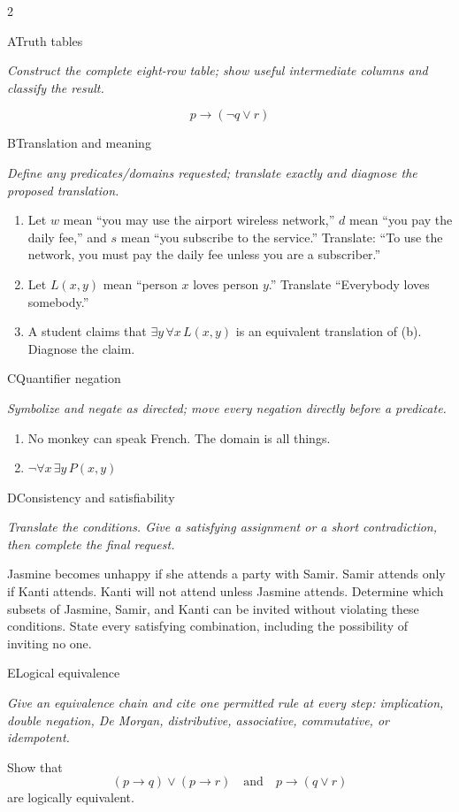 \documentclass[9pt]{extarticle}
\begin{document}
\begin{multicols}{2}
\begin{CoreProblem}{A}{Truth tables}
{\scriptsize\textit{Construct the complete eight-row table; show useful intermediate columns and classify the result.}\par}
\[
  p\to(\neg q\lor r)
\]
\end{CoreProblem}
\begin{CoreProblem}{B}{Translation and meaning}
{\scriptsize\textit{Define any predicates/domains requested; translate exactly and diagnose the proposed translation.}\par}
\begin{enumerate}[label=(\alph*)]
  \item Let $w$ mean ``you may use the airport wireless network,'' $d$ mean
        ``you pay the daily fee,'' and $s$ mean ``you subscribe to the
        service.'' Translate: ``To use the network, you must pay the daily fee
        unless you are a subscriber.''
  \item Let $L(x,y)$ mean ``person $x$ loves person $y$.'' Translate
        ``Everybody loves somebody.''
  \item A student claims that $\exists y\,\forall x\,L(x,y)$ is an equivalent
        translation of (b). Diagnose the claim.
\end{enumerate}
\end{CoreProblem}
\begin{CoreProblem}{C}{Quantifier negation}
{\scriptsize\textit{Symbolize and negate as directed; move every negation directly before a predicate.}\par}
\begin{enumerate}[label=(\alph*)]
  \item No monkey can speak French. The domain is all things.
  \item $\neg\forall x\,\exists y\,P(x,y)$
\end{enumerate}
\end{CoreProblem}
\columnbreak
\begin{CoreProblem}{D}{Consistency and satisfiability}
{\scriptsize\textit{Translate the conditions. Give a satisfying assignment or a short contradiction, then complete the final request.}\par}
Jasmine becomes unhappy if she attends a party with Samir. Samir attends only
if Kanti attends. Kanti will not attend unless Jasmine attends. Determine which
subsets of Jasmine, Samir, and Kanti can be invited without violating these
conditions. State every satisfying combination, including the possibility of
inviting no one.
\end{CoreProblem}
\begin{CoreProblem}{E}{Logical equivalence}
{\scriptsize\textit{Give an equivalence chain and cite one permitted rule at every step: implication, double negation, De Morgan, distributive, associative, commutative, or idempotent.}\par}
Show that
\[
  (p\to q)\lor(p\to r)
  \quad\text{and}\quad
  p\to(q\lor r)
\]
are logically equivalent.
\end{CoreProblem}
\end{multicols}
\end{document}
